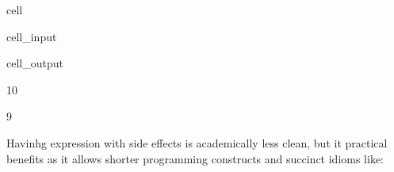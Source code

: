 \documentclass[a4paper,10pt,english]{jupyterBook}
\begin{document}
\begin{sphinxuseclass}{cell}\begin{sphinxVerbatimInput}

\begin{sphinxuseclass}{cell_input}
\begin{sphinxVerbatim}[commandchars=\\\{\}]

\end{sphinxVerbatim}

\end{sphinxuseclass}\end{sphinxVerbatimInput}
\begin{sphinxVerbatimOutput}

\begin{sphinxuseclass}{cell_output}
\begin{sphinxVerbatim}[commandchars=\\\{\}]
10
\end{sphinxVerbatim}

\begin{sphinxVerbatim}[commandchars=\\\{\}]
9
\end{sphinxVerbatim}

\end{sphinxuseclass}\end{sphinxVerbatimOutput}

\end{sphinxuseclass}
\sphinxAtStartPar
Havinhg expression with side effects is academically less clean, but it practical benefits as it allows shorter programming constructs and succinct idioms like:
\end{document}
